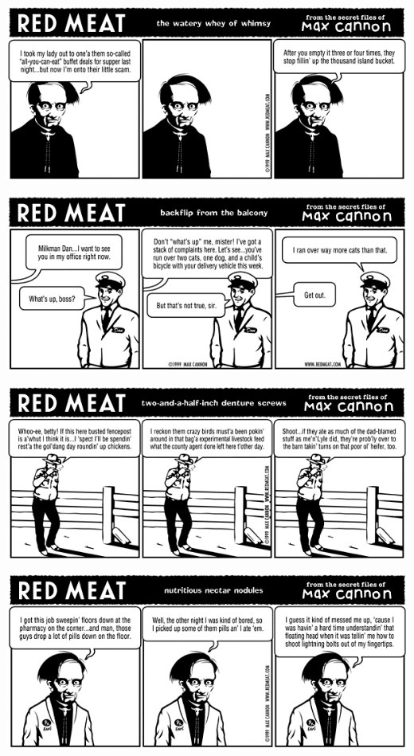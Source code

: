 \documentclass[a4paper,twoside,11pt]{article}
\begin{document}
\includegraphics[width=\textwidth]{redmeat_1999-10-25.png}



\includegraphics[width=\textwidth]{redmeat_1999-11-01.png}



\includegraphics[width=\textwidth]{redmeat_1999-11-08.png}



\includegraphics[width=\textwidth]{redmeat_1999-11-15.png}
\end{document}
